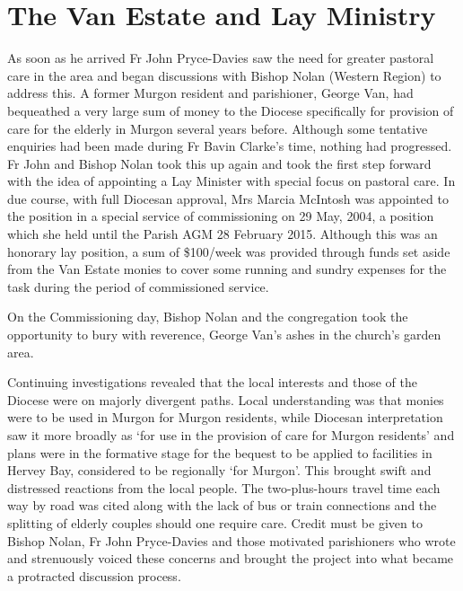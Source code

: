 \section{The Van Estate and Lay Ministry}



As soon as he arrived Fr John Pryce-Davies saw the need for greater pastoral care in the area and began discussions with Bishop Nolan (Western Region) to address this. A former Murgon resident and parishioner, George Van, had bequeathed a very large sum of money to the Diocese specifically for provision of care for the elderly in Murgon several years before. Although some tentative enquiries had been made during Fr Bavin Clarke's time, nothing had progressed. Fr John and Bishop Nolan took this up again and took the first step forward with the idea of appointing a Lay Minister with special focus on pastoral care. In due course, with full Diocesan approval, Mrs Marcia McIntosh was appointed to the position in a special service of commissioning on 29 May, 2004, a position which she held until the Parish AGM 28 February 2015. Although this was an honorary lay position, a sum of \$100/week was provided through funds set aside from the Van Estate monies to cover some running and sundry expenses for the task during the period of commissioned service.



On the Commissioning day, Bishop Nolan and the congregation took the opportunity to bury with reverence, George Van's ashes in the church's garden area.



Continuing investigations revealed that the local interests and those of the Diocese were on majorly divergent paths. Local understanding was that monies were to be used in Murgon for Murgon residents, while Diocesan interpretation saw it more broadly as `for use in the provision of care for Murgon residents' and plans were in the formative stage for the bequest to be applied to facilities in Hervey Bay, considered to be regionally `for Murgon'. This brought swift and distressed reactions from the local people. The two-plus-hours travel time each way by road was cited along with the lack of bus or train connections and the splitting of elderly couples should one require care. Credit must be given to Bishop Nolan, Fr John Pryce-Davies and those motivated parishioners who wrote and strenuously voiced these concerns and brought the project into what became a protracted discussion process.



